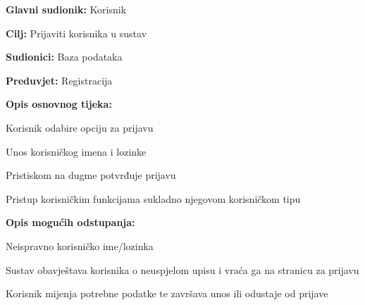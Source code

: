 				
					\noindent {}
					\begin{packed_item}
	
						\item \textbf{Glavni sudionik: }Korisnik
						\item  \textbf{Cilj:} Prijaviti korisnika u sustav
						\item  \textbf{Sudionici:} Baza podataka
						\item  \textbf{Preduvjet:} Registracija
						\item  \textbf{Opis osnovnog tijeka:}
						
						\item[] \begin{packed_enum}
	                        
	                        \item Korisnik odabire opciju za prijavu
							\item Unos korisničkog imena i lozinke
							\item Pristiskom na dugme potvrđuje prijavu
							\item Pristup korisničkim funkcijama sukladno njegovom korisničkom tipu
						\end{packed_enum}
						
						\item  \textbf{Opis mogućih odstupanja:}
						
						\item[] \begin{packed_item}
	
							\item[2.a] Neispravno korisničko ime/lozinka
							\item[] \begin{packed_enum}
								
								\item Sustav obavještava korisnika o neuspjelom upisu i vraća ga na stranicu za prijavu
								\item Korisnik mijenja potrebne podatke te završava unos ili odustaje od prijave
							\end{packed_enum}
						\end{packed_item}
					\end{packed_item}
					
